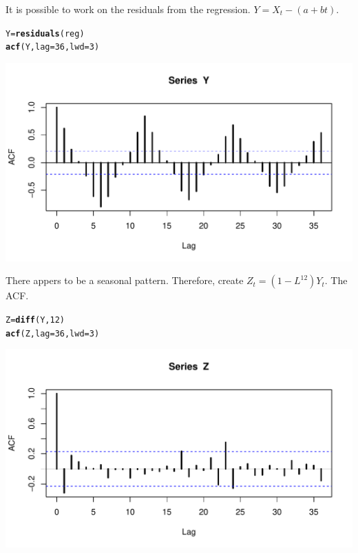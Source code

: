 \documentclass[12pt, a4paper, oneside]{article}\usepackage[]{graphicx}\usepackage[]{color}
\makeatletter
\def\maxwidth{ %
  \ifdim\Gin@nat@width>\linewidth
    \linewidth
  \else
    \Gin@nat@width
  \fi
}
\newcommand{\hlkwd}[1]{\textcolor[rgb]{0.737,0.353,0.396}{\textbf{#1}}}%
\newenvironment{kframe}{%
 \def\at@end@of@kframe{}%
 \ifinner\ifhmode%
  \def\at@end@of@kframe{\end{minipage}}%
  \begin{minipage}{\columnwidth}%
 \fi\fi%
 \def\FrameCommand##1{\hskip\@totalleftmargin \hskip-\fboxsep
 \colorbox{shadecolor}{##1}\hskip-\fboxsep
     \hskip-\linewidth \hskip-\@totalleftmargin \hskip\columnwidth}%
 \MakeFramed {\advance\hsize-\width
   \@totalleftmargin\z@ \linewidth\hsize
   \@setminipage}}%
 {\par\unskip\endMakeFramed%
 \at@end@of@kframe}
\newenvironment{knitrout}{}{} %
\makeatother
\begin{document}
It is possible to work on the residuals from the regression. $Y = X_t - (a + bt)$.
\begin{knitrout}
\color{fgcolor}\begin{kframe}
\begin{alltt}
Y = \hlkwd{residuals}(reg)
\hlkwd{acf}(Y, lag = 36, lwd = 3)
\end{alltt}
\end{kframe}
\includegraphics[width=\maxwidth]{figure/Resid} 

\end{knitrout}

There appers to be a seasonal pattern. Therefore, create $Z_t = (1 - L^{12})Y_t$.  The ACF.
\begin{knitrout}
\color{fgcolor}\begin{kframe}
\begin{alltt}
Z = \hlkwd{diff}(Y, 12)
\hlkwd{acf}(Z, lag = 36, lwd = 3)
\end{alltt}
\end{kframe}
\includegraphics[width=\maxwidth]{figure/cf} 

\end{knitrout}
\end{document}
